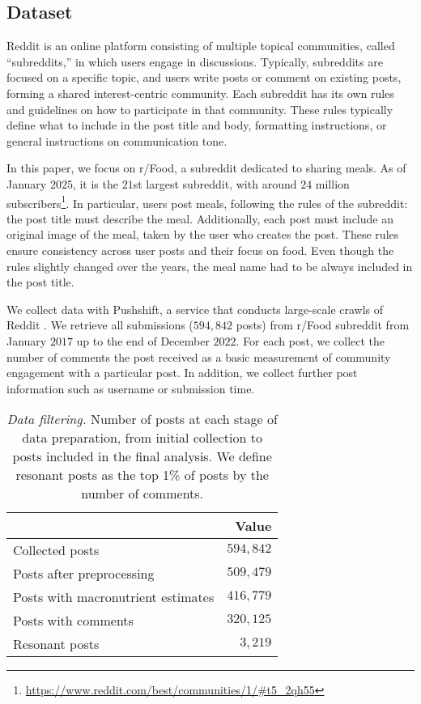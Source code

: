 \subsection{Dataset}

Reddit is an online platform consisting of multiple topical communities, called ``subreddits,'' in which users engage in discussions.
Typically, subreddits are focused on a specific topic, and users write posts or comment on existing posts, forming a shared interest-centric community. 
Each subreddit has its own rules and guidelines on how to participate in that community. 
These rules typically define what to include in the post title and body, formatting instructions, or general instructions on communication tone. 

In this paper, we focus on r/Food, a subreddit dedicated to sharing meals. As of January $2025$, it is the $21$st largest subreddit, with around $24$ million subscribers\footnote{\url{https://www.reddit.com/best/communities/1/\#t5_2qh55}}. 
In particular, users post meals, following the rules of the subreddit: the post title must describe the meal.
Additionally, each post must include an original image of the meal, taken by the user who creates the post.
These rules ensure consistency across user posts and their focus on food. Even though the rules slightly changed over the years, the meal name had to be always included in the post title.


We collect data with Pushshift, a service that conducts large-scale crawls of Reddit \cite{baumgartner_pushshift_2020}.
We retrieve all submissions ($594,842$ posts) from r/Food subreddit from January $2017$ up to the end of December $2022$. 
For each post, we collect the number of comments the post received as a basic measurement of community engagement with a particular post. In addition, we collect further post information such as username or submission time.

\begin{table}[b]
\caption{\textit{Data filtering.} Number of posts at each stage of data preparation, from initial collection to posts included in the final analysis. We define resonant posts as the top 1\% of posts by the number of comments.}
\begin{tabular}{l|r}
                                         & \textbf{Value} \\ \hline
Collected posts                          & $594,842$        \\
Posts after preprocessing                & $509,479$        \\
Posts with macronutrient estimates       & $416,779$         \\
Posts with comments                      & $320,125$        \\ %
Resonant posts                           & $3,219$          \\
\end{tabular}
\end{table}

